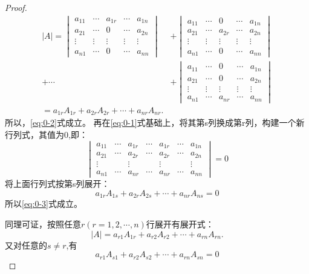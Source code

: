 \begin{proof}
  \begin{equation*}
    \begin{split}
      |A| =
    \begin{vmatrix}
    a_{11} & \cdots & a_{1r}& \cdots & a_{1n}\\
    a_{21} & \cdots & 0 & \cdots & a_{2n}\\
    \vdots & \vdots & \vdots & \vdots & \vdots\\
    a_{n1} & \cdots & 0 & \cdots &a_{nn}
    \end{vmatrix} & +
    \begin{vmatrix}
    a_{11} & \cdots & 0 & \cdots & a_{1n}\\
    a_{21} & \cdots & a_{2r} & \cdots & a_{2n}\\
    \vdots & \vdots & \vdots & \vdots & \vdots\\
    a_{n1} & \cdots & 0 & \cdots &a_{nn}
  \end{vmatrix}\\
    + \cdots & +
  \begin{vmatrix}
    a_{11} & \cdots & 0 & \cdots & a_{1n}\\
    a_{21} & \cdots & 0 & \cdots & a_{2n}\\
    \vdots & \vdots & \vdots & \vdots & \vdots\\
    a_{n1} & \cdots & a_{nr} & \cdots &a_{nn}
  \end{vmatrix}\\
  =a_{1r}A_{1r}+ a_{2r}A_{2r}+\cdots+a_{nr}A_{nr}.
  \end{split}  
\end{equation*}
所以，\eqref{eq:0-2}式成立。
再在\eqref{eq:0-1}式基础上，将其第s列换成第r列，构建一个新行列式，其值为0,即：
\begin{equation*}
  \begin{vmatrix}
    a_{11} & \cdots & a_{1r} & \cdots & a_{1r} & \cdots & a_{1n}\\
    a_{21} & \cdots & a_{2r} & \cdots & a_{2r} & \cdots & a_{2n}\\
    \vdots && \vdots && \vdots && \vdots\\
    a_{n1} & \cdots & a_{nr} & \cdots & a_{nr} & \cdots & a_{nn}
  \end{vmatrix}=0
\end{equation*}
将上面行列式按第s列展开：
\begin{equation*}
  a_{1r}A_{1s}+a_{2r}A_{2s}+\cdots+a_{nr}A_{ns}=0
\end{equation*}
所以\eqref{eq:0-3}式成立。

同理可证，按照任意$r(r=1,2,\cdots,n)$行展开有展开式：
\begin{equation}
    \label{eq:0-4}
    |A|=a_{r1}A_{1r}+ a_{r2}A_{r2}+\cdots+a_{rn}A_{rn}.
  \end{equation}
  又对任意的$s \neq r$,有
  \begin{equation}
    \label{eq:0-5}
    a_{r1}A_{s1}+a_{r2}A_{s2}+\cdots+a_{rn}A_{sn}=0
  \end{equation}
\end{proof}

